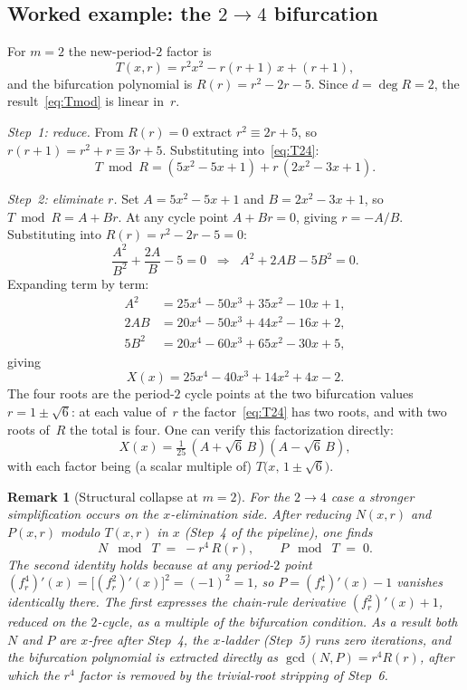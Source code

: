 \documentclass[11pt]{article}
\newtheorem{remark}{Remark}
\begin{document}
\subsection{Worked example: the $2\to4$ bifurcation}
\label{sec:dual-24}

For $m=2$ the new-period-$2$ factor is
\begin{equation}
\label{eq:T24}
T(x,r) = r^2x^2 - r(r+1)\,x + (r+1),
\end{equation}
and the bifurcation polynomial is $R(r) = r^2-2r-5$.  Since $d=\deg R=2$, the
result~\eqref{eq:Tmod} is linear in~$r$.

\textit{Step~1: reduce.}\;  From $R(r)=0$ extract $r^2 \equiv 2r+5$, so
$r(r+1)=r^2+r\equiv 3r+5$.  Substituting into~\eqref{eq:T24}:
\begin{equation}
\label{eq:Tmod24}
T\bmod R = (5x^2 - 5x + 1) + r\,(2x^2-3x+1).
\end{equation}

\textit{Step~2: eliminate $r$.}\;  Set $A = 5x^2-5x+1$ and $B = 2x^2-3x+1$,
so $T\bmod R = A + Br$.  At any cycle point $A + Br = 0$, giving $r = -A/B$.
Substituting into $R(r) = r^2-2r-5 = 0$:
\[
\frac{A^2}{B^2} + \frac{2A}{B} - 5 = 0
\;\;\Longrightarrow\;\;
A^2 + 2AB - 5B^2 = 0.
\]
Expanding term by term:
\begin{align*}
A^2 &= 25x^4 - 50x^3 + 35x^2 - 10x + 1,\\
2AB &= 20x^4 - 50x^3 + 44x^2 - 16x + 2,\\
5B^2 &= 20x^4 - 60x^3 + 65x^2 - 30x + 5,
\end{align*}
giving
\begin{equation}
\label{eq:X24}
X(x) = 25x^4 - 40x^3 + 14x^2 + 4x - 2.
\end{equation}
The four roots are the period-$2$ cycle points at the two bifurcation values
$r = 1 \pm \sqrt{6}$: at each value of~$r$ the factor~\eqref{eq:T24} has two
roots, and with two roots of~$R$ the total is four.  One can verify this
factorization directly:
\[
X(x) = \tfrac{1}{25}\,(A + \sqrt{6}\,B)(A - \sqrt{6}\,B),
\]
with each factor being (a scalar multiple of) $T\bigl(x,\,1\pm\sqrt{6}\bigr)$.

\begin{remark}[Structural collapse at $m=2$]
\label{rem:m2collapse}
For the $2\to4$ case a stronger simplification occurs on the $x$-elimination
side.  After reducing $N(x,r)$ and $P(x,r)$ modulo $T(x,r)$ in $x$ (Step~4 of
the pipeline), one finds
\[
N \;\bmod\; T \;=\; -r^4\,R(r), \qquad P \;\bmod\; T \;=\; 0.
\]
The second identity holds because at any period-$2$ point
$(f_r^4)'(x) = \bigl[(f_r^2)'(x)\bigr]^2 = (-1)^2 = 1$,
so $P = (f_r^4)'(x)-1$ vanishes identically there.  The first expresses the
chain-rule derivative $(f_r^2)'(x)+1$, reduced on the $2$-cycle, as a multiple
of the bifurcation condition.  As a result both $N$ and $P$ are $x$-free after
Step~4, the $x$-ladder (Step~5) runs zero iterations, and the bifurcation
polynomial is extracted directly as $\gcd(N,P) = r^4 R(r)$, after which the
$r^4$ factor is removed by the trivial-root stripping of Step~6.
\end{remark}
\end{document}
